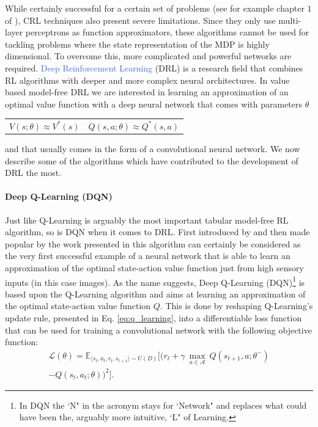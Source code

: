 While certainly successful for a certain set of problems (see for example chapter $1$ of \cite{sabatelli2017learning}), CRL techniques also present severe limitations. Since they only use multi-layer perceptrons as function approximators, these algorithms cannot be used for tackling problems where the state representation of the MDP is highly dimensional. To overcome this, more complicated and powerful networks are required. \textcolor{RoyalBlue}{Deep Reinforcement Learning} (DRL) \cite{arulkumaran2017deep, li2017deep, franccois2018introduction} is a research field that combines RL algorithms with deeper and more complex neural architectures. In value based model-free DRL we are interested in learning an approximation of an optimal value function with a deep neural network that comes with parameters $\theta$

\noindent
\begin{tabularx}{\linewidth}{@{}XX@{}}
\begin{equation}
	  V(s;\theta)\approx V^{*}(s)
	  \label{eq:v_approx}
  \end{equation}
&
\begin{equation}  
	Q(s,a;\theta)\approx Q^{*}(s,a)
	\label{eq:q_approx}
  \end{equation}
\end{tabularx}
and that usually comes in the form of a convolutional neural network. We now describe some of the algorithms which have contributed to the development of DRL the most. 


\paragraph{\textbf{\uppercase{D}eep \uppercase{Q}-\uppercase{L}earning (\uppercase{DQN})}} Just like Q-Learning is arguably the most important tabular model-free RL algorithm, so is DQN when it comes to DRL. First introduced by \citet{mnih2013playing} and then made popular by the work presented in \cite{mnih2015human} this algorithm can certainly be considered as the very first successful example of a neural network that is able to learn an approximation of the optimal state-action value function just from high sensory inputs (in this case images). As the name suggests, Deep Q-Learning (DQN)\footnote{In DQN the `N" in the acronym stays for `Network" and replaces what could have been the, arguably more intuitive, `L" of Learning.} is based upon the Q-Learning algorithm and aims at learning an approximation of the optimal state-action value function $Q$. This is done by reshaping Q-Learning's update rule, presented in Eq. \ref{eq:q_learning}, into a differentiable loss function that can be used for training a convolutional network with the following objective function:
\begin{multline}
	\mathcal{L}(\theta) = \mathds{E}_{\langle s_{t},a_{t},r_{t},s_{t+1}\rangle\sim U(D)} \bigg[\big(r_{t} + \gamma \: \underset{a\in \mathcal{A}}{\max}\: Q(s_{t+1}, a; \theta^{-}) \\ - Q(s_{t}, a_{t}; \theta)\big)^{2}\bigg].
\label{eq:dqn}
\end{multline}

